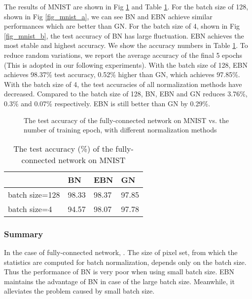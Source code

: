 \documentclass[runningheads]{llncs}
\begin{document}
The results of MNIST are shown in Fig \ref{fig_mnist}  and Table \ref{tab_mnist}. For the batch size of 128, shown in Fig \ref{fig_mnist_a}, we can see BN and EBN achieve similar performances which are better than GN. For the batch size of 4, shown in Fig \ref{fig_mnist_b}, the test accuracy of BN has large fluctuation. EBN achieves the most stable and highest accuracy. We show the accuracy numbers in Table \ref{tab_mnist}. To reduce random variations, we report the average accuracy of the final 5 epochs (This is adopted in our following experiments). With the batch size of 128, EBN achieves 98.37\% test accuracy, 0.52\% higher than GN, which achieves 97.85\%. With the batch size of 4, the test accuracies of all normalization methods have decreased. 
Compared to the batch size of 128, BN, EBN and GN reduces 3.76\%, 0.3\% and 0.07\% respectively. EBN is still better than GN by 0.29\%.  

\begin{figure}[!htb]
\centering
{}
\centering
{}
\caption{The test accuracy of the fully-connected network on MNIST vs. the number of training epoch, with different normalization methods}
\label{fig_mnist}
\end{figure}


\begin{table}[!htb]
\caption{The test accuracy (\%) of the fully-connected network on MNIST}
\label{tab_mnist}
\centering
\begin{tabular}{l|lll}
\hline
  & BN & EBN & GN \\
\hline
batch size=128     & 98.33  & 98.37 & 97.85     \\
batch size=4       & 94.57  & 98.07 & 97.78     \\
\hline
\end{tabular}
\end{table}

\subsubsection{Summary} In the case of fully-connected network,  . The size of pixel set, from which the statistics are computed for batch normalization,  depends only on the batch size. Thus the performance of BN is very poor when using small batch size. EBN maintains the advantage of BN in case of the large batch size. Meanwhile, it alleviates the problem caused by small batch size. 
\end{document}
